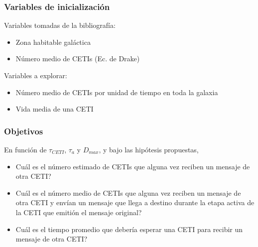\documentclass[handout]{beamer}
\theoremstyle{plain}
\theoremstyle{definition}
\theoremstyle{remark}
\begin{document}
\begin{frame}\frametitle{Variables de inicialización}


   Variables tomadas de la bibliografía:

   \begin{itemize}
      \item Zona habitable galáctica
      \item Número medio de CETIs (Ec. de Drake)
   \end{itemize}

   \vspace{1cm}

   Variables a explorar:

    \begin{itemize}
      \item Número medio de CETIs por unidad de tiempo en toda la
         galaxia
      \item Vida media de una CETI
   \end{itemize}
 

\end{frame}%
                         
\begin{frame}\frametitle{Objetivos}

   En función de $\tau_{CETI}$, $\tau_{a}$ y $D_{max}$, y bajo las
   hipótesis propuestas,

   \begin{itemize}
      \item Cuál es el número estimado de CETIs que alguna vez reciben un
         mensaje de otra CETI?
      \item Cuál es el número medio de CETIs que alguna vez reciben un
         mensaje de otra CETI y envían un mensaje que llega a destino
         durante la etapa activa de la CETI que emitión el mensaje
         original?
      \item Cuál es el tiempo promedio que debería esperar una CETI
         para recibir un mensaje de otra CETI?
   \end{itemize}

\end{frame}%
                    
\end{document}
